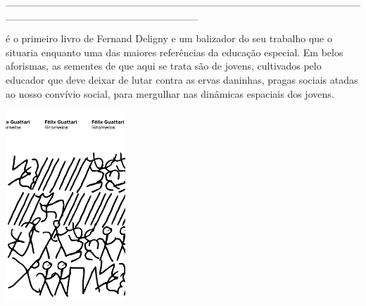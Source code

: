 {\hspace*{-2cm}\_\_\_\_\_\_\_\_\_\_\_\_\_\_\_\_\_\_\_\_\_\_\_\_\_\_\_\_\_\_\_\_\_\_\_\_\_\_\_\_\_\_\_\_\_\_\_\_\_\_\_\_\_\_\_\_\_\_\_\_\_\_\_\_\_\_\_\_\_\_\_\_\_\_

\medskip

 é o primeiro livro de Fernand Deligny e um balizador do seu trabalho que o situaria enquanto uma das maiores referências da educação especial. Em belos aforismas, as sementes de que aqui se trata são de jovens, cultivados pelo educador que deve deixar de lutar contra as ervas daninhas, pragas sociais atadas ao nosso convívio social, para mergulhar nas dinâmicas espaciais dos jovens.

\vfill

\hspace*{-.4cm}\begin{minipage}[c]{0.90\linewidth}
\small{
{}}
\end{minipage}

\pagebreak

\hspace{.5cm}

\begin{center}
\hspace*{-.5cm}\includegraphics[width=45mm]{./imgs/guattari.png}
\end{center}

}
